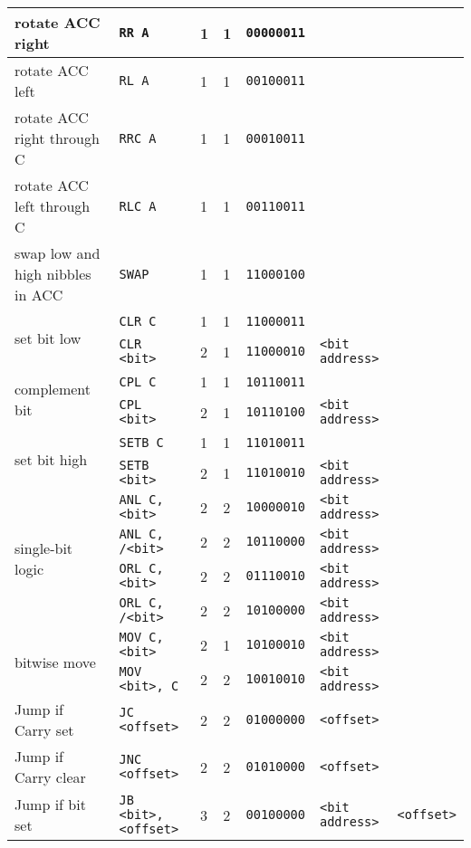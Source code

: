\documentclass[journal]{IEEEtran}
\begin{document}
{{\begin{tabular}{|l|l|l|l|l|l|l|}
		\hline
		rotate ACC right & \texttt{RR A}
		& 1 & 1 & \texttt{00000011} & & \\
		\hline
		rotate ACC left & \texttt{RL A}
		& 1 & 1 & \texttt{00100011} & & \\
		\hline
		rotate ACC right through C
		& \texttt{RRC A} & 1 & 1 & \texttt{00010011} & & \\
		\hline
		rotate ACC left through C
		& \texttt{RLC A} & 1 & 1 & \texttt{00110011} & & \\
		\hline
		swap low and high nibbles in ACC
		& \texttt{SWAP} & 1 & 1 & \texttt{11000100} & & \\
		\hline
		\multirow{2}{*}{set bit low}
		& \texttt{CLR C} & 1 & 1 & \texttt{11000011} & & \\
		& \texttt{CLR <bit>} & 2 & 1 & \texttt{11000010} & \texttt{<bit address>} & \\
		\hline
		\multirow{2}{*}{complement bit}
		& \texttt{CPL C} & 1 & 1 & \texttt{10110011} & & \\
		& \texttt{CPL <bit>} & 2 & 1 & \texttt{10110100} & \texttt{<bit address>} & \\
		\hline
		\multirow{2}{*}{set bit high} &
		\texttt{SETB C} & 1 & 1 & \texttt{11010011} & & \\
		& \texttt{SETB <bit>} & 2 & 1 & \texttt{11010010} & \texttt{<bit address>} & \\
		\hline
		\multirow{4}{*}{single-bit logic}
		& \texttt{ANL C, <bit>} & 2 & 2 & \texttt{10000010} & \texttt{<bit address>} & \\
		& \texttt{ANL C, /<bit>} & 2 & 2 & \texttt{10110000} & \texttt{<bit address>} & \\
		& \texttt{ORL C, <bit>} & 2 & 2 & \texttt{01110010} & \texttt{<bit address>} & \\
		& \texttt{ORL C, /<bit>} & 2 & 2 & \texttt{10100000} & \texttt{<bit address>} & \\
		\hline
		\multirow{2}{*}{bitwise move}
		& \texttt{MOV C, <bit>} & 2 & 1 & \texttt{10100010} & \texttt{<bit address>} & \\
		& \texttt{MOV <bit>, C} & 2 & 2 & \texttt{10010010} & \texttt{<bit address>} & \\
		\hline
		Jump if Carry set
		& \texttt{JC <offset>} & 2 & 2 & \texttt{01000000} & \texttt{<offset>} & \\
		\hline
		Jump if Carry clear
		& \texttt{JNC <offset>} & 2 & 2 & \texttt{01010000} & \texttt{<offset>} & \\
		\hline
		Jump if bit set
		& \texttt{JB <bit>, <offset>} & 3 & 2 & \texttt{00100000} & \texttt{<bit address>} & \texttt{<offset>} \\

\end{tabular}}}
\end{document}
